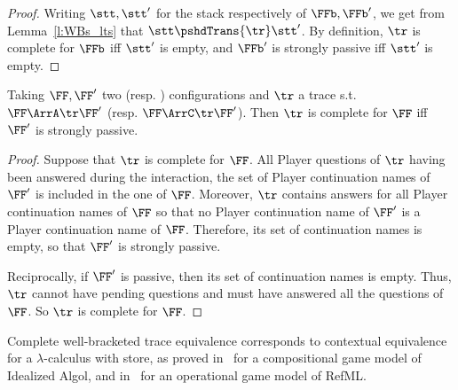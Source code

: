 \begin{proof}
  Writing $\stt,\stt'$ for the stack respectively of $\FFb,\FFb'$,
  we get from Lemma~\ref{l:WBs_lts} that
  $\stt \pshdTrans{\tr} \stt'$.
  By definition, $\tr$ is complete for $\FFb$ iff $\stt'$ is empty,
  and $\FFb'$ is strongly passive iff $\stt'$ is empty.
\end{proof}

\begin{lemma}
  \label{l:OGS_complete-strongly-passive}
    Taking $\FF,\FF'$ two \AOGS (resp. \COGS) configurations
    and $\tr$ a trace  s.t. $\FF \ArrA \tr \FF'$
    (resp. $\FF \ArrC \tr \FF'$).  
    Then $\tr$ is complete for $\FF$
    iff $\FF'$ is strongly passive. 
\end{lemma} 

\begin{proof}
  Suppose that $\tr$ is complete for $\FF$.
  All Player questions of $\tr$ having been answered during the interaction, 
  the set of Player continuation names of $\FF'$
  is included in the one of $\FF$.
  Moreover, $\tr$ contains answers for all Player continuation names of $\FF$
  so that no Player continuation name of $\FF'$ is a Player continuation name of $\FF$.
  Therefore, its set of continuation names is empty,
  so that $\FF'$ is strongly passive.

  Reciprocally, if $\FF'$ is passive, then its set of continuation names is empty.
  Thus, $\tr$ cannot have pending questions and must
  have answered all the questions of $\FF$.
  So $\tr$ is complete for $\FF$.
\end{proof}
\noindent
Complete well-bracketed trace equivalence corresponds to contextual equivalence for a 
$\lambda$-calculus with store, as proved in~\cite{abramsky1997linearity} for 
a compositional game model of Idealized Algol,
and in~\cite{laird2007} for an operational game model of RefML.

